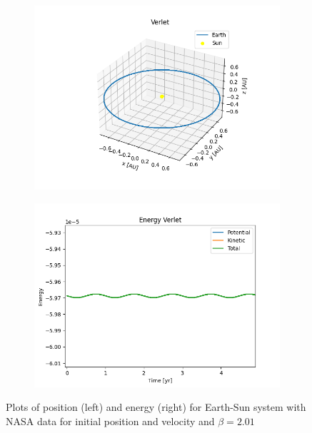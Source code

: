    \begin{figure}[H]
		\centering
		\begin{subfigure}{0.48\linewidth}
			\includegraphics[width=1.2\linewidth]{Figure/Position_NASA_B201.png}
		\end{subfigure}
		\begin{subfigure}{0.48\linewidth}
			\includegraphics[width=1.15\linewidth]{Figure/Energy_NASA_B201.png}
		\end{subfigure}
		\caption{Plots of position (left) and energy (right) for Earth-Sun system with NASA data for initial position and velocity and $\beta = 2.01$}
		\label{B201_NASA}
	\end{figure}
	
